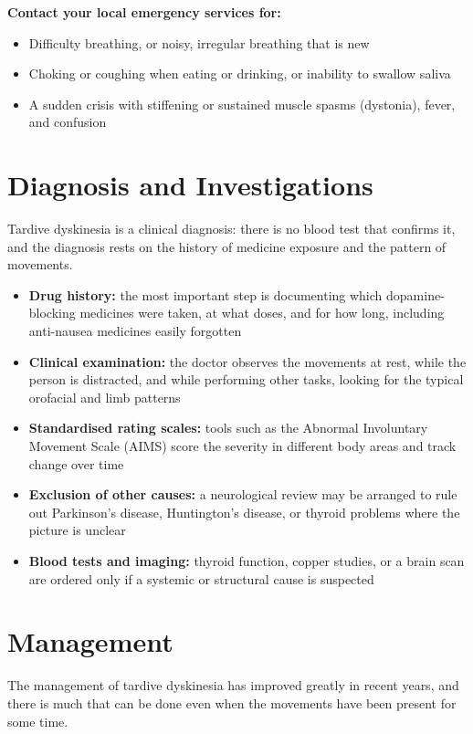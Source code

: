 \textbf{Contact your local emergency services for:}
\begin{itemize}
    \item Difficulty breathing, or noisy, irregular breathing that is new
    \item Choking or coughing when eating or drinking, or inability to swallow saliva
    \item A sudden crisis with stiffening or sustained muscle spasms (dystonia), fever, and confusion
\end{itemize}

\section*{Diagnosis and Investigations}
Tardive dyskinesia is a clinical diagnosis: there is no blood test that confirms it, and the diagnosis rests on the history of medicine exposure and the pattern of movements.

\begin{itemize}
    \item \textbf{Drug history:} the most important step is documenting which dopamine-blocking medicines were taken, at what doses, and for how long, including anti-nausea medicines easily forgotten
    \item \textbf{Clinical examination:} the doctor observes the movements at rest, while the person is distracted, and while performing other tasks, looking for the typical orofacial and limb patterns
    \item \textbf{Standardised rating scales:} tools such as the Abnormal Involuntary Movement Scale (AIMS) score the severity in different body areas and track change over time
    \item \textbf{Exclusion of other causes:} a neurological review may be arranged to rule out Parkinson's disease, Huntington's disease, or thyroid problems where the picture is unclear
    \item \textbf{Blood tests and imaging:} thyroid function, copper studies, or a brain scan are ordered only if a systemic or structural cause is suspected
\end{itemize}

\section*{Management}
The management of tardive dyskinesia has improved greatly in recent years, and there is much that can be done even when the movements have been present for some time.

